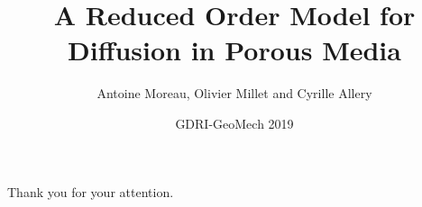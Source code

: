 \documentclass[handout]%
{beamer}
\title{A Reduced Order Model for Diffusion in Porous Media}
\author{Antoine Moreau, Olivier Millet and Cyrille Allery}
\institute{LaSIE, Universit\'e de La Rochelle}
\date{GDRI-GeoMech 2019}
\begin{document}

\maketitle


%


%


%


%






\begin{frame}%
\begin{center}
Thank you for your attention.
\end{center}
\end{frame}

%
%
\end{document}
